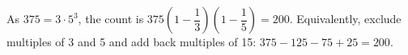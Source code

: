 As $375=3\cdot5^3$, the count is $375(1-\dfrac{1}{3})(1-\dfrac{1}{5})=\boxed{200}$. Equivalently, exclude multiples of 3 and 5 and add back multiples of 15: $375-125-75+25=200$.
